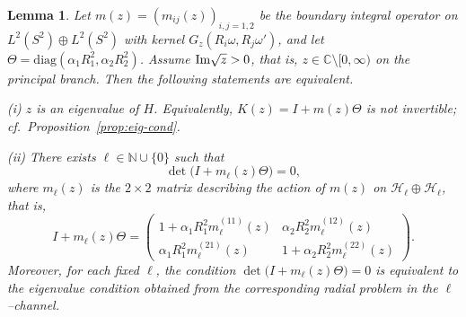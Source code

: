 \documentclass[a4paper,11pt]{article}
\numberwithin{equation}{section}
\renewcommand{\Im}{\text{{\rm Im}}}
\newtheorem{lem}[thm]{Lemma}
\theoremstyle{definition}
\theoremstyle{remark}
\begin{document}
\begin{lem}\label{lem:eq-secular}
Let $m(z)=(m_{ij}(z))_{i,j=1,2}$ be the boundary integral operator on
$L^2(S^2)\oplus L^2(S^2)$ with kernel $G_z(R_i\omega,R_j\omega')$, and let
$\Theta=\mathrm{diag}(\alpha_1R_1^2,\alpha_2R_2^2)$.
Assume $\Im\sqrt{z}>0$, that is, $z\in\mathbb C\setminus[0,\infty)$ on the
principal branch.
Then the following statements are equivalent.

{\rm (i)} $z$ is an eigenvalue of $H$. Equivalently, $K(z)=I+m(z)\Theta$ is not
invertible; cf.\ Proposition~\ref{prop:eig-cond}.

{\rm (ii)} There exists $\ell\in\mathbb N\cup\{0\}$ such that
$$
\det\bigl(I+m_\ell(z)\Theta\bigr)=0,
$$
where $m_\ell(z)$ is the $2\times2$ matrix describing the action of $m(z)$ on
$\mathcal H_\ell\oplus\mathcal H_\ell$, that is,
$$
I+m_\ell(z)\Theta=
\left(
\begin{array}{cc}
1+\alpha_1R_1^2m^{(11)}_\ell(z) & \alpha_2R_2^2 m^{(12)}_\ell(z)\\[2pt]
\alpha_1R_1^2 m^{(21)}_\ell(z) & 1+\alpha_2R_2^2m^{(22)}_\ell(z)
\end{array}
\right).
$$
Moreover, for each fixed $\ell$, the condition
$\det\bigl(I+m_\ell(z)\Theta\bigr)=0$
is equivalent to the eigenvalue condition obtained from the corresponding
radial problem in the $\ell$--channel.
\end{lem}
\end{document}
